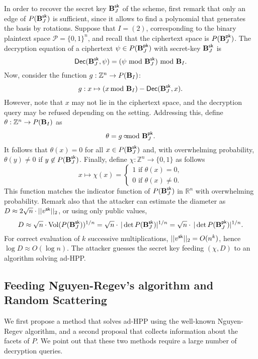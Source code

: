 \documentclass[11pt]{article}
\theoremstyle{plain}
\theoremstyle{definition}
\theoremstyle{remark}
\newcommand{\RR}{\mathbb{R}}      %
\newcommand{\ZZ}{\mathbb{Z}}      %
\newcommand{\sk}{{\sf sk}}
\newcommand{\pk}{{\sf pk}}
\newcommand{\Dec}{{\sf Dec}}
\newcommand{\BB}{{\mbox{\bf B}}}
\begin{document}
In order to recover the secret key $\BB_J^\sk$ of the scheme, first remark that only an edge of $P(\BB_J^\sk)$ is sufficient, since it allows to find a polynomial that generates the basis by rotations. Suppose that $I=(2)$, corresponding to the binary plaintext space $\mathcal{P}=\{0,1\}^n$, and recall that the ciphertext space is $P(\BB_J^\pk)$. The decryption equation of a ciphertext $\psi\in P(\BB_J^\pk)$ with secret-key $\BB_J^\sk$ is
$$\Dec(\BB_J^\sk,\psi)=(\psi\!\!\mod \BB_J^\sk)\!\!\mod \BB_I.$$
Now, consider the function $g:\ZZ^n\to P(\BB_I)$:
$$g:x\mapsto (x\!\!\!\mod \BB_I)-\Dec(\BB_J^\sk,x).$$
However, note that $x$ may not lie in the ciphertext space, and the decryption query may be refused depending on the setting. Addressing this, define 
$\theta:\ZZ^n\to P(\BB_I)$ as
$$\theta= g \circ \!\!\!\!\!\!\mod \BB_J^\pk.$$
It follows that $\theta(x)=0$ for all $x\in P(\BB_J^\sk)$ and, with overwhelming probability, $\theta(y)\not=0$ if $y\not\in P(\BB_J^\sk)$. Finally, define $\chi:\ZZ^n\to\{0,1\}$ as follows
$$
x\mapsto \chi(x)=
\left\{
\begin{array}{cc}
1\mbox{ if }\theta(x)=0,\\
0\mbox{ if }\theta(x)\neq 0.
\end{array}
\right.
$$
This function matches the indicator function of $P(\BB_J^\sk)$ in $\RR^n$ with overwhelming probability. Remark also that the attacker can estimate the diameter as $D\approx 2\sqrt{n}\cdot||v^\sk||_2$, or using only public values,
$$D\approx \sqrt{n}\cdot \mbox{Vol}(P(\BB_J^\sk))^{1/n}=\sqrt{n}\cdot\,|\det P(\BB_J^\sk)|^{1/n}=\sqrt{n}\cdot\,|\det P(\BB_J^\pk)|^{1/n}.$$
For correct evaluation of $k$ successive multiplications, $||v^\sk||_2=O(n^k)$, hence $\log D\approx O(\log{n}).$ The attacker guesses the secret key feeding $(\chi,D)$ to an algorithm solving ad-HPP.

\subsection{Feeding Nguyen-Regev's algorithm and Random Scattering}
We first propose a method that solves ad-HPP using the well-known Nguyen-Regev algorithm, and a second proposal that collects information about the facets of $P$. We point out that these two methods require a large number of decryption queries.
\end{document}
